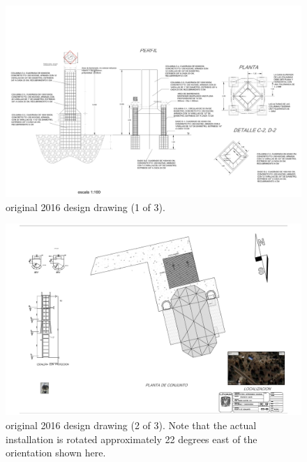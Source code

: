 \begin{figure}
\begin{center}
\includegraphics[height=0.75\linewidth,angle=90]{figures/buildings-ddoti-drawing-2016-1.pdf}
\end{center}
\caption{{\projectname} original 2016 design drawing (1 of 3).}
\label{figure:buildings-drawing-2016-1}
\end{figure}

\begin{figure}
\begin{center}
\includegraphics[height=0.75\linewidth,angle=90]{figures/buildings-ddoti-drawing-2016-2.pdf}
\end{center}
\caption{{\projectname} original 2016 design drawing (2 of 3). Note that the actual installation is rotated approximately 22 degrees east of the orientation shown here.}
\label{figure:buildings-drawing-2016-2}
\end{figure}

